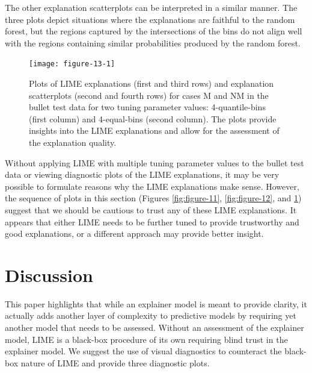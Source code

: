 \documentclass[AMS,STIX2COL]{WileyNJD-v2}\usepackage[]{graphicx}\usepackage[]{color}
\newenvironment{knitrout}{}{} %
\begin{document}
The other explanation scatterplots can be interpreted in a similar manner. The three plots depict situations where the explanations are faithful to the random forest, but the regions captured by the intersections of the bins do not align well with the regions containing similar probabilities produced by the random forest.

\begin{figure}[!thp]
\begin{knitrout}
\color{fgcolor}

{\centering \texttt{[image: figure-13-1]} 

}



\end{knitrout}
\caption{Plots of LIME explanations (first and third rows) and explanation scatterplots (second and fourth rows) for  cases M and NM in the bullet test data for two tuning parameter values: 4-quantile-bins (first column) and 4-equal-bins (second column).  The plots provide insights into the LIME explanations and allow for the assessment of the explanation quality.}
\label{fig:figure-13}
\end{figure}

Without applying LIME with multiple tuning parameter values to the bullet test data or viewing diagnostic plots of the LIME explanations, it may be very possible to formulate reasons why the LIME explanations make sense. However, the sequence of plots in this section (Figures \ref{fig:figure-11}, \ref{fig:figure-12}, and \ref{fig:figure-13}) suggest that we should be cautious to trust any of these LIME explanations. It appears that either LIME needs to be further tuned to provide trustworthy and good explanations, or a different approach may provide better insight. 

\section{Discussion} \label{discussion}

This paper highlights that while an explainer model is meant to provide clarity, it actually adds another layer of complexity to predictive models by requiring yet another model that needs to be assessed. Without an assessment of the explainer model, LIME is a black-box procedure of its own requiring blind trust in the explainer model. We suggest the use of visual diagnostics to counteract the black-box nature of LIME and provide three diagnostic plots.
\end{document}
